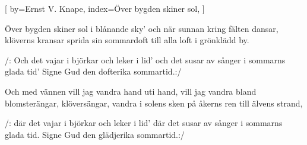 

[
by={Ernst V. Knape},
index={Över bygden skiner sol},
]

\beginverse*
Över bygden skiner sol i blånande sky'
och när sunnan kring fälten dansar,
klöverns kransar
sprida sin sommardoft
till alla loft
i grönklädd by.
\endverse

\beginchorus
/: Och det vajar i björkar och leker i lid'
och det susar av sånger i sommarns glada tid'
Signe Gud den dofterika sommartid.:/
\endchorus							%

\beginverse* 
Och med vännen vill jag vandra hand uti hand,
vill jag vandra bland blomsterängar,
klöversängar,
vandra i solens sken
på åkerns ren
till älvens strand,
\endverse

\beginchorus
/: där det vajar i björkar och leker i lid'
där det susar av sånger i sommarns glada tid.
Signe Gud den glädjerika sommartid.:/
\endchorus	
\endsong


